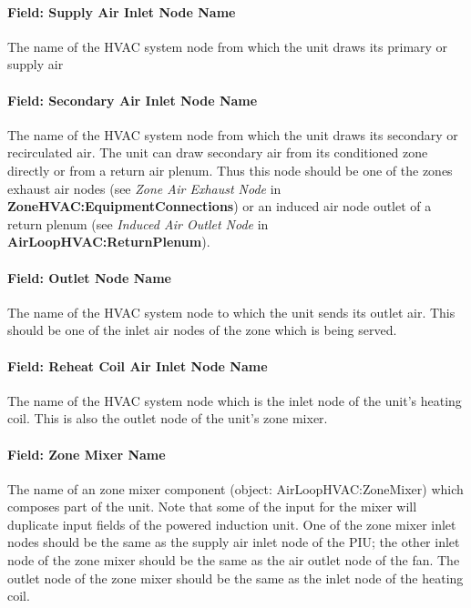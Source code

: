 \paragraph{Field: Supply Air Inlet Node Name}\label{field-supply-air-inlet-node-name-1}

The name of the HVAC system node from which the unit draws its primary or supply air

\paragraph{Field: Secondary Air Inlet Node Name}\label{field-secondary-air-inlet-node-name-1}

The name of the HVAC system node from which the unit draws its secondary or recirculated air. The unit can draw secondary air from its conditioned zone directly or from a return air plenum. Thus this node should be one of the zones exhaust air nodes (see \emph{Zone Air Exhaust Node} in \textbf{ZoneHVAC:EquipmentConnections}) or an induced air node outlet of a return plenum (see \emph{Induced Air Outlet Node} in \textbf{AirLoopHVAC:ReturnPlenum}).

\paragraph{Field: Outlet Node Name}\label{field-outlet-node-name-1}

The name of the HVAC system node to which the unit sends its outlet air. This should be one of the inlet air nodes of the zone which is being served.

\paragraph{Field: Reheat Coil Air Inlet Node Name}\label{field-reheat-coil-air-inlet-node-name-1}

The name of the HVAC system node which is the inlet node of the unit's heating coil. This is also the outlet node of the unit's zone mixer.

\paragraph{Field: Zone Mixer Name}\label{field-zone-mixer-name-1}

The name of an zone mixer component (object: AirLoopHVAC:ZoneMixer) which composes part of the unit. Note that some of the input for the mixer will duplicate input fields of the powered induction unit. One of the zone mixer inlet nodes should be the same as the supply air inlet node of the PIU; the other inlet node of the zone mixer should be the same as the air outlet node of the fan. The outlet node of the zone mixer should be the same as the inlet node of the heating coil.

